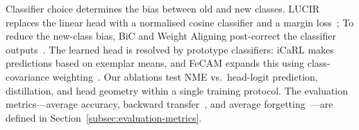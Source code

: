 Classifier choice determines the bias between old and new classes.  LUCIR replaces the linear head with a normalised cosine classifier and a margin
loss~\cite{hou2019lucir}; To reduce the new-class bias, BiC and Weight Aligning post-correct the classifier outputs~\cite{wu2019bic,zhao2020wa}.
The learned head is resolved by prototype classifiers: iCaRL makes predictions based on exemplar means, and FeCAM expands this using class-covariance weighting~\cite{rebuffi2017icarl,goswami2023fecam}.  Our ablations test
NME vs.\ head-logit prediction, distillation, and head geometry within a
single training protocol.  The evaluation metrics---average accuracy, backward
transfer~\cite{lopezpaz2017gem}, and average
forgetting~\cite{chaudhry2019tiny}---are defined in
Section~\ref{subsec:evaluation-metrics}.

